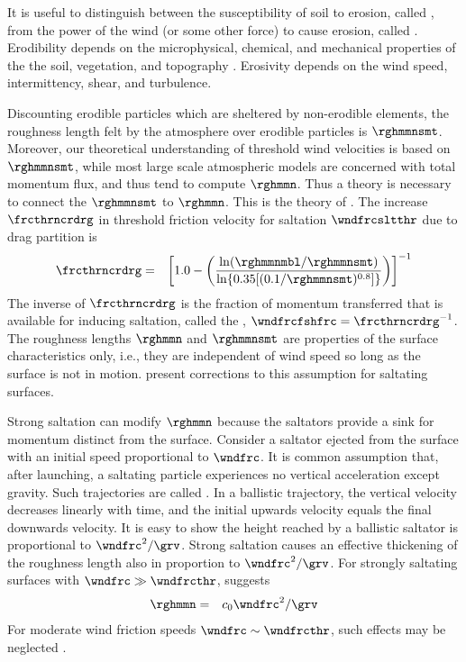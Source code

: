 \documentclass[12pt,twoside]{book}
\begin{document}
It is useful to distinguish between the susceptibility of soil to
erosion, called , from the power of the wind
(or some other force) to cause erosion, called .
Erodibility depends on the microphysical, chemical, and mechanical
properties of the the soil, vegetation, and topography
\cite[][]{DYO01}. 
Erosivity depends on the wind speed, intermittency, shear, and
turbulence. 

Discounting erodible particles which are sheltered by non-erodible
elements, the roughness length felt by the atmosphere over erodible
particles is $\rghmmnsmt$.
Moreover, our theoretical understanding of threshold wind velocities
is based on $\rghmmnsmt$, while most large scale atmospheric models
are concerned with total momentum flux, and thus tend to compute
$\rghmmn$.  
Thus a theory is necessary to connect the $\rghmmnsmt$ to $\rghmmn$.
This is the theory of .
The increase $\frcthrncrdrg$ in threshold friction velocity for
saltation $\wndfrcsltthr$ due to drag partition is \cite[]{MaB95}
\begin{eqnarray}
\frcthrncrdrg & = & \left[ 1.0 - 
\left( \frac{\ln (\rghmmnmbl/\rghmmnsmt) }
{ \ln \{ 0.35 [ (0.1/\rghmmnsmt)^{0.8} ] \} } \right)
\right]^{-1}
\label{eqn:frc_thr_ncr_drg}
\end{eqnarray}
The inverse of $\frcthrncrdrg$ is the fraction of momentum transferred
that is available for inducing saltation, called the , $\wndfrcfshfrc = \frcthrncrdrg^{-1}$.
The roughness lengths $\rghmmn$ and $\rghmmnsmt$ are properties 
of the surface characteristics only, i.e., they are independent 
of wind speed so long as the surface is not in motion.
\cite{GMB98} present corrections to this assumption for saltating
surfaces. 

Strong saltation can modify $\rghmmn$ because the saltators
provide a sink for momentum distinct from the surface.
Consider a saltator ejected from the surface with an initial speed
proportional to $\wndfrc$. 
It is common assumption that, after launching, a saltating particle
experiences no vertical acceleration except gravity.  
Such trajectories are called .
In a ballistic trajectory, the vertical velocity decreases linearly
with time, and the initial upwards velocity equals the final downwards
velocity. 
It is easy to show the height reached by a ballistic saltator is
proportional to $\wndfrc^{2}/\grv$. 
Strong saltation causes an effective thickening of the roughness
length also in proportion to $\wndfrc^{2}/\grv$.
For strongly saltating surfaces with $\wndfrc \gg \wndfrcthr$, 
\cite{Cha83} suggests
\begin{eqnarray}
\rghmmn & = & c_{0} \wndfrc^{2} / \grv %
\label{eqn:rgh_lmt}
\end{eqnarray}
For moderate wind friction speeds $\wndfrc \sim \wndfrcthr$, such
effects may be neglected \cite[]{LeR91}.  
\end{document}

